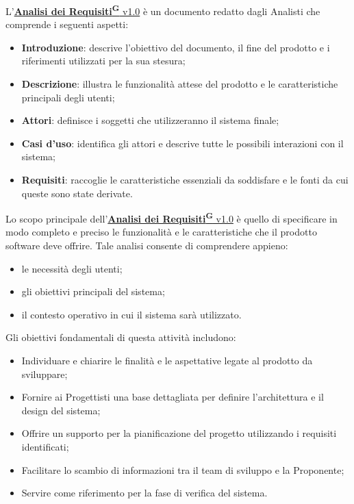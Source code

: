 L'\href{https://code7crusaders.github.io/docs/RTB/documentazione_interna/glossario.html#analisi-dei-requisiti}{\textbf{Analisi dei Requisiti\textsuperscript{G}} v1.0} è un documento redatto dagli Analisti che comprende i seguenti aspetti:
\begin{itemize}
    \item \textbf{Introduzione}: descrive l’obiettivo del documento, il fine del prodotto e i riferimenti utilizzati per la sua stesura;
    \item \textbf{Descrizione}: illustra le funzionalità attese del prodotto e le caratteristiche principali degli utenti;
    \item \textbf{Attori}: definisce i soggetti che utilizzeranno il sistema finale;
    \item \textbf{Casi d’uso}: identifica gli attori e descrive tutte le possibili interazioni con il sistema;
    \item \textbf{Requisiti}: raccoglie le caratteristiche essenziali da soddisfare e le fonti da cui queste sono state derivate.
\end{itemize}

Lo scopo principale dell'\href{https://code7crusaders.github.io/docs/RTB/documentazione_interna/glossario.html#analisi-dei-requisiti}{\textbf{Analisi dei Requisiti\textsuperscript{G}} v1.0} è quello di specificare in modo completo e preciso le funzionalità e le caratteristiche che il prodotto software deve offrire. Tale analisi consente di comprendere appieno:
\begin{itemize}
    \item le necessità degli utenti;
    \item gli obiettivi principali del sistema;
    \item il contesto operativo in cui il sistema sarà utilizzato.
\end{itemize}

Gli obiettivi fondamentali di questa attività includono:
\begin{itemize}
    \item Individuare e chiarire le finalità e le aspettative legate al prodotto da sviluppare;
    \item Fornire ai Progettisti una base dettagliata per definire l’architettura e il design del sistema;
    \item Offrire un supporto per la pianificazione del progetto utilizzando i requisiti identificati;
    \item Facilitare lo scambio di informazioni tra il team di sviluppo e la Proponente;
    \item Servire come riferimento per la fase di verifica del sistema.
\end{itemize}


